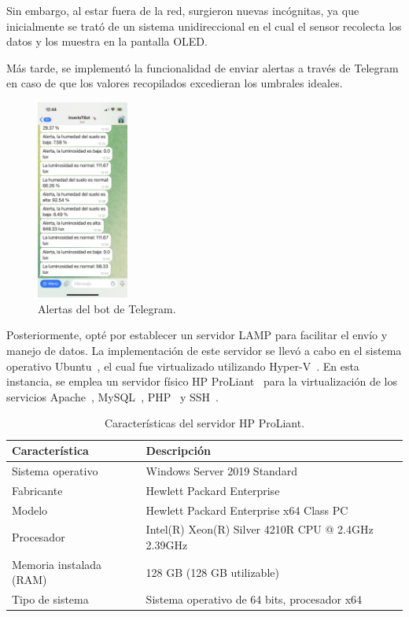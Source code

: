 Sin embargo, al estar fuera de la red, surgieron nuevas incógnitas, ya que inicialmente se trató de un sistema unidireccional en el cual el sensor recolecta los datos y los muestra en la pantalla OLED.

Más tarde, se implementó la funcionalidad de enviar alertas a través de Telegram en caso de que los valores recopilados excedieran los umbrales ideales.

\begin{figure}[h]
	\centering
	\includegraphics[width=0.27\textwidth]{img/desarrollo/BotTelegram_alertas.png}
	\caption{Alertas del bot de Telegram.} \label{Img:BotTelegram_alertas}
\end{figure}

Posteriormente, opté por establecer un servidor LAMP para facilitar el envío y manejo de datos. La implementación de este servidor se llevó a cabo en el sistema operativo Ubuntu~\cite{misc:Ubuntu}, el cual fue virtualizado utilizando Hyper-V~\cite{manual:Hyper_V}.
En esta instancia, se emplea un servidor físico HP ProLiant~\cite{misc:HP_ProLiant} para la virtualización de los servicios Apache~\cite{misc:Apache}, MySQL~\cite{misc:Mysql}, PHP~\cite{misc:PHP} y SSH~\cite{misc:SSH}.

\begin{table}[htbp]
\begin{center}
\caption{Características del servidor HP ProLiant.}
\begin{tabular}{|l|l|}
\hline
\rowcolor[HTML]{C0C0C0} 
\textbf{Característica} & \textbf{Descripción}\\ \hline
Sistema operativo & Windows Server 2019 Standard\\ \hline
Fabricante & Hewlett Packard Enterprise \\ \hline
Modelo & Hewlett Packard Enterprise x64 Class PC\\ \hline
Procesador & Intel(R) Xeon(R) Silver 4210R CPU @ 2.4GHz 2.39GHz\\ \hline
Memoria instalada (RAM) & 128 GB (128 GB utilizable) \\ \hline
Tipo de sistema & Sistema operativo de 64 bits, procesador x64 \\ \hline
\end{tabular}
\end{center}
\end{table}

